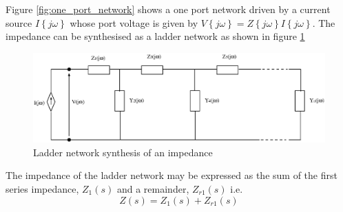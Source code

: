 Figure \ref{fig:one_port_network} shows a one port network driven by a current source $I\left\{ j \omega \right\}$ whose port voltage is given by $V\left\{ j \omega \right\}=Z\left\{ j \omega \right\}I\left\{ j \omega \right\}$. The impedance can be synthesised as a ladder network as shown in figure \ref{cauer_1}
%
\begin{figure}[ht]
\centering
\includegraphics[scale=0.7]{./Imgs/cauer_1.eps}
\caption{Ladder network synthesis of an impedance}
\label{cauer_1}
\end{figure}
%
The impedance of the ladder network may be expressed as the sum of the first series impedance, $Z_1(s)$ and a remainder, $Z_{r1}(s)$ i.e.
%
\begin{equation} \label{eq:cauer_2}
Z\left(s\right)=Z_1(s)+Z_{r1}(s)
\end{equation}
%

